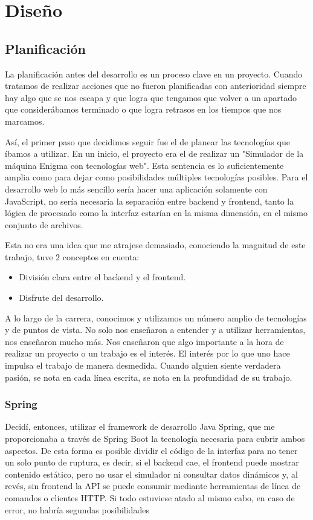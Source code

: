\chapter{Diseño}
\label{cap:diseno}

\section {Planificación}
La planificación antes del desarrollo es un proceso clave en un proyecto. Cuando tratamos de realizar acciones que no fueron planificadas con anterioridad siempre hay algo que se nos escapa y que logra que tengamos que volver a un apartado que considerábamos terminado o  que logra retrasos en los tiempos que nos marcamos. 

Así, el primer paso que decidimos seguir fue el de planear las tecnologías que íbamos a utilizar. En un inicio, el proyecto era el de realizar un "Simulador de la máquina Enigma con tecnologías web". Esta sentencia es lo suficientemente amplia como para dejar como posibilidades múltiples tecnologías posibles. Para el desarrollo web lo más sencillo sería hacer una aplicación solamente con JavaScript, no sería necesaria la separación entre backend y frontend, tanto la lógica de procesado como la interfaz estarían en la misma dimensión, en el mismo conjunto de archivos. 

Esta no era una idea que me atrajese demasiado, conociendo la magnitud de este trabajo, tuve 2 conceptos en cuenta: 
\begin{itemize}
	\item División clara entre el backend y el frontend.
	\item Disfrute del desarrollo.
\end{itemize}
A lo largo de la carrera, conocimos y utilizamos un número amplio de tecnologías y de puntos de vista. No solo nos enseñaron a entender y a utilizar herramientas, nos enseñaron mucho más. Nos enseñaron que algo importante a la hora de realizar un proyecto o un trabajo es el interés. El interés por lo que uno hace impulsa el trabajo de manera desmedida. Cuando alguien siente verdadera pasión, se nota en cada línea escrita, se nota en la profundidad de su trabajo. 

\subsection {Spring}

Decidí, entonces, utilizar el framework de desarrollo Java Spring, que me proporcionaba a través de Spring Boot la tecnología necesaria para cubrir ambos aspectos. De esta forma es posible dividir el código de la interfaz para no tener un solo punto de ruptura, es decir, si el backend cae, el frontend puede mostrar contenido estático, pero no usar el simulador ni consultar datos dinámicos y, al revés, sin frontend la API se puede consumir mediante herramientas de línea de comandos o clientes HTTP. Si todo estuviese atado al mismo cabo, en caso de error, no habría segundas posibilidades


